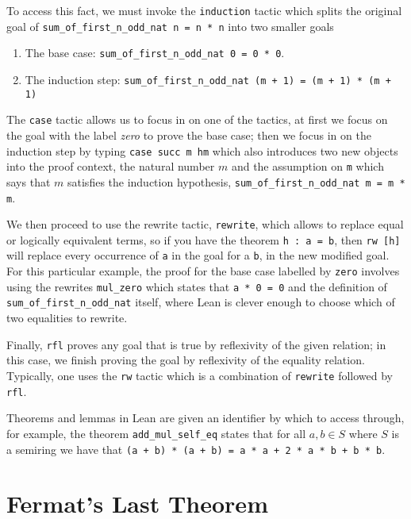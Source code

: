 \begin{example}
    To access this fact, we must invoke the \texttt{induction} tactic which splits the original goal of \texttt{sum\_of\_first\_n\_odd\_nat n = n * n} into two smaller goals

    \begin{enumerate}
        \item The base case: \texttt{sum\_of\_first\_n\_odd\_nat 0 = 0 * 0}.
        \item The induction step: \texttt{sum\_of\_first\_n\_odd\_nat (m + 1) = (m + 1) * (m + 1)}
    \end{enumerate}

    The \texttt{case} tactic allows us to focus in on one of the tactics, at first we focus on the goal with the label \textit{zero} to prove the base case;
    then we focus in on the induction step by typing \texttt{case succ m hm} which also introduces two new objects into the proof context, the natural number $m$ and the assumption
    on \texttt{m} which says that $m$ satisfies the induction hypothesis, \texttt{sum\_of\_first\_n\_odd\_nat m = m * m}. 
    
    We then proceed to use the rewrite tactic, \texttt{rewrite}, which allows to replace equal or logically equivalent terms, so if you have the theorem \texttt{h : a = b}, then \texttt{rw [h]} will replace every occurrence of \texttt{a} in the goal
    for a \texttt{b}, in the new modified goal. For this particular example, the proof for the base case labelled by \texttt{zero} involves using the rewrites \texttt{mul_zero} which states that \texttt{a * 0 = 0} and
    the definition of  \texttt{sum\_of\_first\_n\_odd\_nat} itself, where Lean is clever enough to choose which of two equalities to rewrite.

    Finally, \texttt{rfl} proves any goal that is true by reflexivity of the given relation; in this case, we finish proving the goal by reflexivity of the equality relation. Typically, one
    uses the \texttt{rw} tactic which is a combination of \texttt{rewrite} followed by \texttt{rfl}.

    Theorems and lemmas in Lean are given an identifier by which to access through, for example, the theorem \texttt{add\_mul\_self\_eq} states that for all $a, b \in S$ where $S$ is a semiring
    we have that \texttt{(a + b) * (a + b) = a * a + 2 * a * b + b * b}.
\end{example}


\section{Fermat's Last Theorem}


